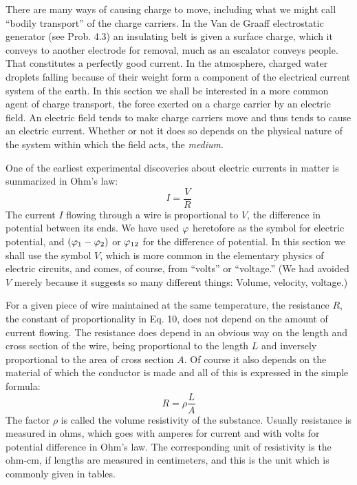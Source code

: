 There are many ways of causing charge to move, including what
we might call ``bodily transport'' of the charge carriers. In the
Van de Graaff electrostatic generator (see Prob. 4.3) an insulating
belt is given a surface charge, which it conveys to another electrode
for removal, much as an escalator conveys people. That constitutes
a perfectly good current. In the atmosphere, charged water droplets
falling because of their weight form a component of the electrical
current system of the earth. In this section we shall be interested in
a more common agent of charge transport, the force exerted on a
charge carrier by an electric field. An electric field tends to make
charge carriers move and thus tends to cause an electric current.
Whether or not it does so depends on the physical nature of the system
within which the field acts, the \emph{medium}.

One of the earliest experimental discoveries about electric currents
in matter is summarized in Ohm's law:
\begin{equation}
  I = \frac{V}{R}
\end{equation}
The current $I$ flowing through a wire is proportional to $V$, the difference
in potential between its ends. We have used $\varphi$ heretofore as
the symbol for electric potential, and $(\varphi_1-\varphi_2)$ or $\varphi_{12}$ for the difference
of potential. In this section we shall use the symbol $V$, which
is more common in the elementary physics of electric circuits, and
comes, of course, from ``volts'' or ``voltage.'' (We had avoided $V$
merely because it suggests so many different things: Volume, velocity,
voltage.)

For a given piece of wire maintained at the same temperature, the
resistance $R$, the constant of proportionality in Eq. 10, does not depend
on the amount of current flowing. The resistance does depend
in an obvious way on the length and cross section of the wire, being
proportional to the length $L$ and inversely proportional to the area
of cross section $A$. Of course it also depends on the material of
which the conductor is made and all of this is expressed in the simple
formula:
\begin{equation}
  R = \rho \frac{L}{A}
\end{equation}
The factor $\rho$ is called the volume resistivity of the substance. Usually
resistance is measured in ohms, which goes with amperes for current
and with volts for potential difference in Ohm's law. The corresponding
unit of resistivity is the ohm-cm, if lengths are measured
in centimeters, and this is the unit which is commonly given in tables.


